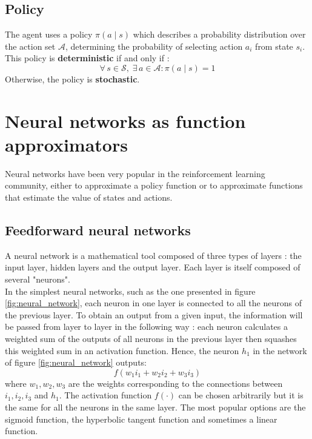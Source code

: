 \subsection{Policy}
The agent uses a policy $\pi(a \mid s)$ which describes a probability
distribution over the action set $\mathcal{A}$, determining the probability of
selecting action $a_i$ from state $s_i$. This policy is 
\textbf{deterministic} if and only if :
\begin{equation}
\forall\, s \in \mathcal{S},\; \exists\, a \in \mathcal{A} : \pi(a \mid s) = 1
\end{equation}
\noindent Otherwise, the policy is \textbf{stochastic}.


\section{Neural networks as function approximators}
Neural networks have been very popular in the reinforcement learning community,
either to approximate a policy function or to approximate functions that
estimate the value of states and actions.\\

\subsection{Feedforward neural networks}
A neural network is a mathematical tool composed of three types of layers : 
the input layer, hidden layers and the output layer. Each layer is itself
composed of several "neurons".\\

In the simplest neural networks, such as the one presented in figure 
\ref{fig:neural_network}, each neuron in one layer is connected to all the
neurons of the previous layer. To obtain an output from a given input,
the information will be passed from layer to layer in the following way : 
each neuron calculates a weighted sum of the outputs of all neurons in the
previous layer then squashes this weighted sum in an activation function. 
Hence, the neuron $h_1$ in the network of figure \ref{fig:neural_network}
outputs:
$$ f(w_1i_1 + w_2i_2 + w_3i_3) $$
where $w_1, w_2, w_3$ are the weights corresponding to the connections between
$i_1, i_2, i_3$ and $h_1$. The activation function $f(\cdot)$ can be chosen 
arbitrarily but it is
the same for all the neurons in the same layer. The most popular options are
the sigmoid function, the hyperbolic tangent function and sometimes a linear
function.

